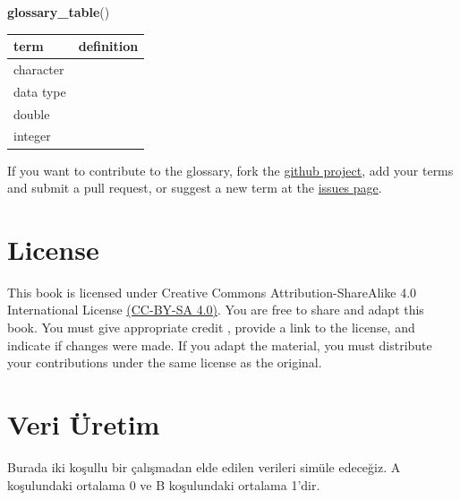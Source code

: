 \documentclass[
  oneside]{book}
\newenvironment{Shaded}{\begin{snugshade}}{\end{snugshade}}
\newcommand{\FunctionTok}[1]{\textcolor[rgb]{0.13,0.29,0.53}{\textbf{#1}}}
\newcommand{\NormalTok}[1]{#1}
\begin{document}
\begin{Shaded}
\begin{Highlighting}[]
\FunctionTok{glossary\_table}\NormalTok{()}
\end{Highlighting}
\end{Shaded}

\begin{table}
\centering
\begin{tabular}{l|l}
\hline
term & definition\\
\hline
character & \\
\hline
data type & \\
\hline
double & \\
\hline
integer & \\
\hline
\end{tabular}
\end{table}

If you want to contribute to the glossary, fork the \href{https://github.com/PsyTeachR/glossary}{github project}, add your terms and submit a pull request, or suggest a new term at the \href{https://github.com/PsyTeachR/glossary/issues}{issues page}.

\hypertarget{license}{%
\chapter*{License}\label{license}}

This book is licensed under Creative Commons Attribution-ShareAlike 4.0 International License \href{https://creativecommons.org/licenses/by-sa/4.0/}{(CC-BY-SA 4.0)}. You are free to share and adapt this book. You must give appropriate credit \citep{psyteachr-template}, provide a link to the license, and indicate if changes were made. If you adapt the material, you must distribute your contributions under the same license as the original.

\hypertarget{veri-uxfcretim}{%
\chapter{Veri Üretim}\label{veri-uxfcretim}}

Burada iki koşullu bir çalışmadan elde edilen verileri simüle edeceğiz.
A koşulundaki ortalama 0 ve B koşulundaki ortalama 1'dir.
\end{document}
